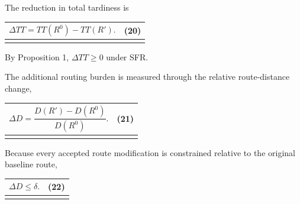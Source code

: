 \documentclass[
]{article}
\newcounter{none} %
\begin{document}
The reduction in total tardiness is

{\def\LTcaptype{none} %
\begin{longtable}[]{@{}
  >{\raggedright\arraybackslash}p{}
  >{\raggedright\arraybackslash}p{}@{}}
\toprule\noalign{}
\begin{minipage}[b]{\linewidth}\raggedright
\[\Delta TT = TT\left( R^{0} \right) - TT\left( R' \right).\]
\end{minipage} & \begin{minipage}[b]{\linewidth}\raggedleft
(20)
\end{minipage} \\
\midrule\noalign{}
\endhead
\bottomrule\noalign{}
\endlastfoot
\end{longtable}
}

By Proposition 1, \(\Delta TT \geq 0\) under SFR.

The additional routing burden is measured through the relative
route-distance change,

{\def\LTcaptype{none} %
\begin{longtable}[]{@{}
  >{\raggedright\arraybackslash}p{}
  >{\raggedright\arraybackslash}p{}@{}}
\toprule\noalign{}
\begin{minipage}[b]{\linewidth}\raggedright
\[\Delta D = \frac{D\left( R' \right) - D\left( R^{0} \right)}{D\left( R^{0} \right)}.\]
\end{minipage} & \begin{minipage}[b]{\linewidth}\raggedleft
(21)
\end{minipage} \\
\midrule\noalign{}
\endhead
\bottomrule\noalign{}
\endlastfoot
\end{longtable}
}

Because every accepted route modification is constrained relative to the
original baseline route,

{\def\LTcaptype{none} %
\begin{longtable}[]{@{}
  >{\raggedright\arraybackslash}p{}
  >{\raggedright\arraybackslash}p{}@{}}
\toprule\noalign{}
\begin{minipage}[b]{\linewidth}\raggedright
\[\Delta D \leq \delta.\]
\end{minipage} & \begin{minipage}[b]{\linewidth}\raggedleft
(22)
\end{minipage} \\
\midrule\noalign{}
\endhead
\bottomrule\noalign{}
\endlastfoot
\end{longtable}
}
\end{document}
